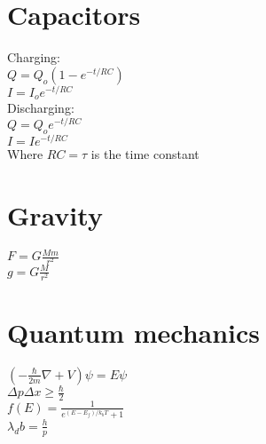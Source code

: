 \begin{multicols}{2}
    \chapter{Capacitors}
    Charging:\\
    $Q=Q_o(1-e^{-t/RC})$\\
    $I=I_o e^{-t/RC}$\\
    Discharging:\\
    $Q=Q_oe^{-t/RC}$\\
    $I=I e^{-t/RC}$\\
    Where $RC=\tau$ is the time constant\\

    \chapter{Gravity}
    $F=G\frac{Mm}{r^2}$\\
    $g=G\frac{M}{r^2}$\\
    
    \chapter{Quantum mechanics}
    $\left(-\frac{\hbar}{2m}\nabla+V\right)\psi=E\psi $\\
    $\Delta p \Delta x \geq \frac{\hbar}{2}$\\
    $f(E)=\frac{1}{e^{(E-E_f)/k_bT}+1}$\\
    $\lambda_db=\frac{h}{p}$\\
    \end{multicols}